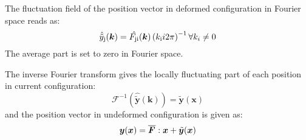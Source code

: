 \documentclass[a4paper,12pt]{article}
\newcommand{\tnsr}[1]{\ensuremath{\bm{{#1}}}}
\newcommand{\vctr}[1]{\ensuremath{\bm{#1}}}
\newcommand{\F}[1][]{\ensuremath{\tnsr F^{{\rm #1}}}}
\begin{document}
The fluctuation field of the position vector in deformed configuration in Fourier space reads as:
\begin{equation}
\hat{\tilde{y}}_{\rm j}(\vctr k) = \hat{F_{\rm ji}}(\vctr k) \left(k_{\rm i} i 2 \pi \right)^{-1} \forall k_i \neq 0
\end{equation}
The average part is set to zero in Fourier space.

The inverse Fourier transform gives the locally fluctuating part of each position in current configuration:
\begin{equation}
\mathcal{F}^{-1}\left(\hat{\tilde{\vctr y}}(\vctr k) \right) = \tilde{\vctr y}(\vctr x)
\end{equation}
and the position vector in undeformed configuration is given as:
\begin{equation}
\vctr y(\vctr x) = \overline{\F}: \vctr x + \tilde{\vctr y}(\vctr x)
\end{equation}
\end{document}
